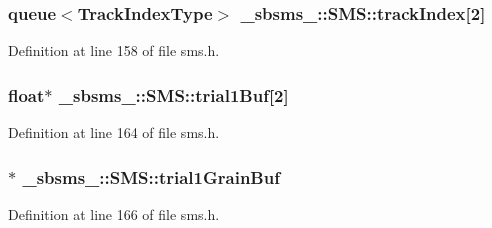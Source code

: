 \subsubsection[{\texorpdfstring{track\+Index}{trackIndex}}]{\setlength{\rightskip}{0pt plus 5cm}queue$<${\bf Track\+Index\+Type}$>$ \+\_\+sbsms\+\_\+\+::\+S\+M\+S\+::track\+Index\mbox{[}2\mbox{]}\hspace{0.3cm}{\ttfamily [protected]}}\hypertarget{class__sbsms___1_1_s_m_s_a2b383b40c04d4b557e29d80f0a4cf45d}{}\label{class__sbsms___1_1_s_m_s_a2b383b40c04d4b557e29d80f0a4cf45d}


Definition at line 158 of file sms.\+h.

\subsubsection[{\texorpdfstring{trial1\+Buf}{trial1Buf}}]{\setlength{\rightskip}{0pt plus 5cm}float$\ast$ \+\_\+sbsms\+\_\+\+::\+S\+M\+S\+::trial1\+Buf\mbox{[}2\mbox{]}\hspace{0.3cm}{\ttfamily [protected]}}\hypertarget{class__sbsms___1_1_s_m_s_ae582c65ec175a547811687fe9fc87422}{}\label{class__sbsms___1_1_s_m_s_ae582c65ec175a547811687fe9fc87422}


Definition at line 164 of file sms.\+h.

\subsubsection[{\texorpdfstring{trial1\+Grain\+Buf}{trial1GrainBuf}}]{$\ast$ \+\_\+sbsms\+\_\+\+::\+S\+M\+S\+::trial1\+Grain\+Buf\hspace{0.3cm}{\ttfamily [protected]}}\hypertarget{class__sbsms___1_1_s_m_s_af922869082cd58fe5251992f04b243d0}{}\label{class__sbsms___1_1_s_m_s_af922869082cd58fe5251992f04b243d0}


Definition at line 166 of file sms.\+h.

